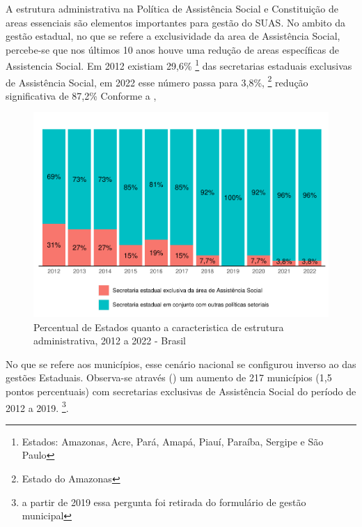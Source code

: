 \documentclass[
  brazilian]{report}
\begin{document}
A estrutura administrativa na Política de Assistência Social e
Constituição de areas essenciais são elementos importantes para gestão
do SUAS. No ambito da gestão estadual, no que se refere a exclusividade
da area de Assistência Social, percebe-se que nos últimos 10 anos houve
uma redução de areas específicas de Assistencia Social. Em 2012 existiam
29,6\%
\footnote{Estados: Amazonas, Acre, Pará, Amapá, Piauí, Paraíba, Sergipe e São Paulo}
das secretarias estaduais exclusivas de Assistência Social, em 2022 esse
número passa para 3,8\%, \footnote{Estado do Amazonas} redução
significativa de 87,2\% Conforme a ,

\begin{figure}
\includegraphics{Censo-SUAS-2022_files/figure-latex/estados_sec_exc-1} \caption[Percentual de Estados quanto a caracteristica de estrutura administrativa, 2012 a 2022 - Brasil]{Percentual de Estados quanto a caracteristica de estrutura administrativa, 2012 a 2022 - Brasil}\label{fig:estados_sec_exc}
\end{figure}

No que se refere aos municípios, esse cenário nacional se configurou
inverso ao das gestões Estaduais. Observa-se através
() um aumento de 217 municípios (1,5 pontos
percentuais) com secretarias exclusivas de Assistência Social do período
de 2012 a 2019.
\footnote{a partir de 2019 essa pergunta foi retirada do formulário de gestão municipal}.
\end{document}
